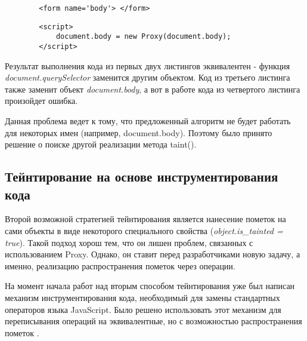 	\begin{lstlisting}
		<form name='body'> </form>
	\end{lstlisting}

	\begin{lstlisting}
		<script>
			document.body = new Proxy(document.body);
		</script>
	\end{lstlisting}

	Результат выполнения кода из первых двух листингов эквивалентен - функция \textit{document.querySelector} заменится другим объектом. Код из третьего листинга также заменит объект \textit{document.body}, а вот в работе кода из четвертого листинга произойдет ошибка.


	Данная проблема ведет к тому, что предложенный алгоритм не будет работать для некоторых имен (например, document.body). Поэтому было принято решение о поиске другой реализации метода taint().

\subsection{Тейнтирование на основе инструментирования кода}
	Второй возможной стратегией тейнтирования является нанесение пометок на сами объекты в виде некоторого специального свойства (\textit{object.is\_tainted = true}). Такой подход хорош тем, что он лишен проблем, связанных с использованием Proxy. Однако, он ставит перед разработчиками новую задачу, а именно, реализацию распространения пометок через операции.


	На момент начала работ над вторым способом тейнтирования уже был написан механизм инструментирования кода, необходимый для замены стандартных операторов языка JavaScript. Было решено использовать этот механизм для переписывания операций на эквивалентные, но с возможностью распространения пометок \cite{rewriting} \cite{rewriting2}. 


